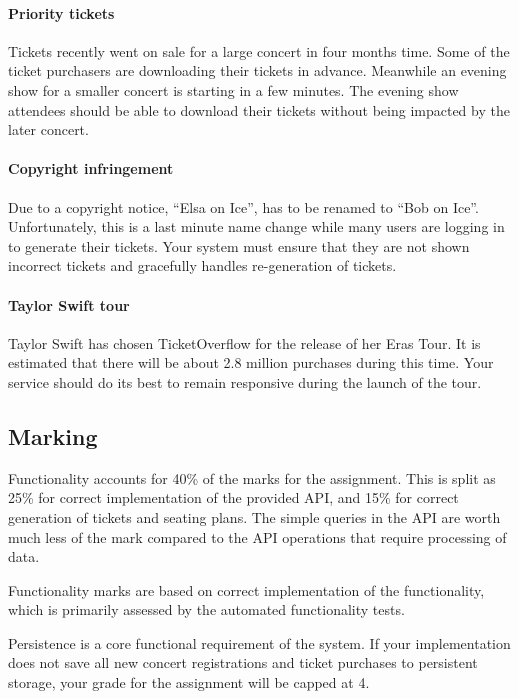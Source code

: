 \documentclass{csse4400}
\begin{document}
\paragraph{Priority tickets}
Tickets recently went on sale for a large concert in four months time.
Some of the ticket purchasers are downloading their tickets in advance.
Meanwhile an evening show for a smaller concert is starting in a few minutes.
The evening show attendees should be able to download their tickets without being impacted by the later concert.

\paragraph{Copyright infringement}
Due to a copyright notice, ``Elsa on Ice'', has to be renamed to ``Bob on Ice''.
Unfortunately, this is a last minute name change while many users are logging in to generate their tickets.
Your system must ensure that they are not shown incorrect tickets and gracefully handles re-generation of tickets.

\paragraph{Taylor Swift tour}
Taylor Swift has chosen TicketOverflow for the release of her Eras Tour.
It is estimated that there will be about 2.8 million purchases during this time.
Your service should do its best to remain responsive during the launch of the tour.


\subsection{Marking}
Functionality accounts for 40\% of the marks for the assignment.
This is split as 25\% for correct implementation of the provided API,
and 15\% for correct generation of tickets and seating plans.
The simple queries in the API are worth much less of the mark compared to the API operations that require processing of data.

Functionality marks are based on correct implementation of the functionality,
which is primarily assessed by the automated functionality tests.

Persistence is a core functional requirement of the system.
If your implementation does not save all new concert registrations and ticket purchases to persistent storage,
your grade for the assignment will be capped at 4.
\end{document}
